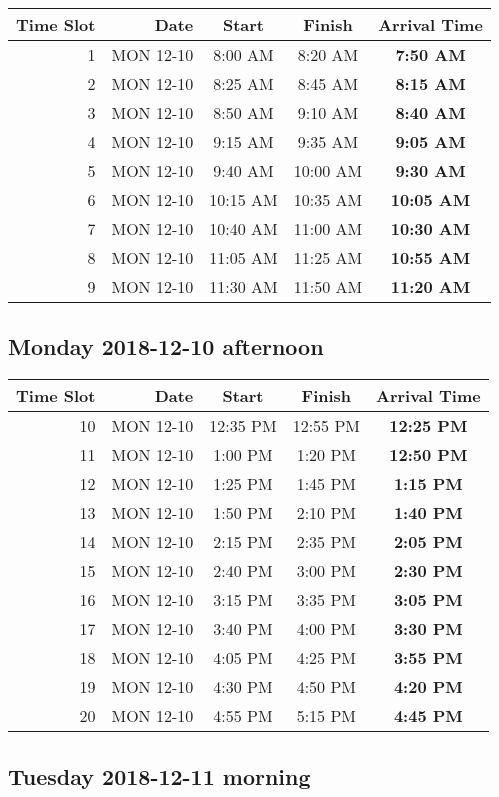 \documentclass[]{book}
\theoremstyle{definition}
\theoremstyle{definition}
\theoremstyle{definition}
\theoremstyle{remark}
\begin{document}
\begin{longtable}[]{@{}rrccc@{}}
\toprule
Time Slot & Date & Start & Finish & \textbf{Arrival Time}\tabularnewline
\midrule
\endhead
1 & MON 12-10 & 8:00 AM & 8:20 AM & \textbf{7:50 AM}\tabularnewline
2 & MON 12-10 & 8:25 AM & 8:45 AM & \textbf{8:15 AM}\tabularnewline
3 & MON 12-10 & 8:50 AM & 9:10 AM & \textbf{8:40 AM}\tabularnewline
4 & MON 12-10 & 9:15 AM & 9:35 AM & \textbf{9:05 AM}\tabularnewline
5 & MON 12-10 & 9:40 AM & 10:00 AM & \textbf{9:30 AM}\tabularnewline
6 & MON 12-10 & 10:15 AM & 10:35 AM & \textbf{10:05 AM}\tabularnewline
7 & MON 12-10 & 10:40 AM & 11:00 AM & \textbf{10:30 AM}\tabularnewline
8 & MON 12-10 & 11:05 AM & 11:25 AM & \textbf{10:55 AM}\tabularnewline
9 & MON 12-10 & 11:30 AM & 11:50 AM & \textbf{11:20 AM}\tabularnewline
\bottomrule
\end{longtable}

\hypertarget{monday-2018-12-10-afternoon}{%
\subsection{Monday 2018-12-10
afternoon}\label{monday-2018-12-10-afternoon}}

\begin{longtable}[]{@{}rrccc@{}}
\toprule
Time Slot & Date & Start & Finish & \textbf{Arrival Time}\tabularnewline
\midrule
\endhead
10 & MON 12-10 & 12:35 PM & 12:55 PM & \textbf{12:25 PM}\tabularnewline
11 & MON 12-10 & 1:00 PM & 1:20 PM & \textbf{12:50 PM}\tabularnewline
12 & MON 12-10 & 1:25 PM & 1:45 PM & \textbf{1:15 PM}\tabularnewline
13 & MON 12-10 & 1:50 PM & 2:10 PM & \textbf{1:40 PM}\tabularnewline
14 & MON 12-10 & 2:15 PM & 2:35 PM & \textbf{2:05 PM}\tabularnewline
15 & MON 12-10 & 2:40 PM & 3:00 PM & \textbf{2:30 PM}\tabularnewline
16 & MON 12-10 & 3:15 PM & 3:35 PM & \textbf{3:05 PM}\tabularnewline
17 & MON 12-10 & 3:40 PM & 4:00 PM & \textbf{3:30 PM}\tabularnewline
18 & MON 12-10 & 4:05 PM & 4:25 PM & \textbf{3:55 PM}\tabularnewline
19 & MON 12-10 & 4:30 PM & 4:50 PM & \textbf{4:20 PM}\tabularnewline
20 & MON 12-10 & 4:55 PM & 5:15 PM & \textbf{4:45 PM}\tabularnewline
\bottomrule
\end{longtable}

\hypertarget{tuesday-2018-12-11-morning}{%
\subsection{Tuesday 2018-12-11
morning}\label{tuesday-2018-12-11-morning}}
\end{document}
